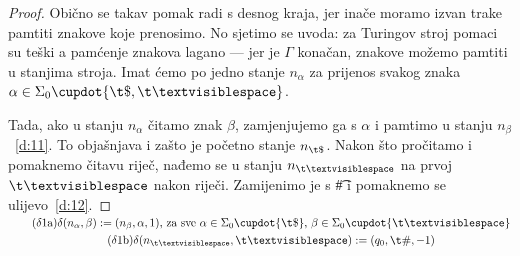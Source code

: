 \begin{proof}
	Obično se takav pomak radi s desnog kraja, jer inače moramo izvan trake pamtiti znakove koje prenosimo. No sjetimo se uvoda: za Turingov stroj pomaci su teški a pamćenje znakova lagano --- jer je $\Gamma$ konačan, znakove možemo pamtiti u stanjima stroja. Imat ćemo po jedno stanje $n_\alpha$ za prijenos svakog znaka $\alpha\in\Sigma_0\dcup\{\t\$,\bl\}$. %

    Tada, ako u stanju $n_\alpha$ čitamo znak $\beta$, zamjenjujemo ga s $\alpha$ i pamtimo u stanju $n_\beta$~\eqref{d:11}. To objašnjava i zašto je početno stanje $n_{\t\$}$. Nakon što pročitamo i pomaknemo čitavu riječ, nađemo se u stanju $n_{\bl}$ na prvoj $\bl$ nakon riječi. Zamijenimo je s \t\# i pomaknemo se ulijevo~\eqref{d:12}.
\end{proof}
\noindent\begin{gather*}
    \SwapAboveDisplaySkip
\label{d:11}\tag{$\delta$1a}
    \delta(n_\alpha,\beta):=(n_{\beta},\alpha,1)\text{, za sve }\alpha\in\Sigma_0\dcup\{\t\$\}\text{, }\beta\in\Sigma_0\dcup\{\bl\}\\
\label{d:12}\tag{$\delta$1b}
    \delta(n_{\bl},\bl):=(q_0,\t\#,-1)
\end{gather*}

